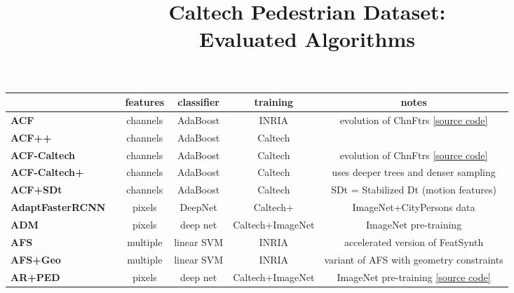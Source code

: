 \documentclass[onecolumn]{article}
\begin{document}
\title{ Caltech Pedestrian Dataset:\\ Evaluated Algorithms}
\date{}\maketitle\vspace{-8mm}

\renewcommand{\arraystretch}{1.20}
\newcommand{\chmrk}{{\centering\ding{51}}}

\def\cp{\hspace{2mm}}
\begin{table}[!h]\centering\footnotesize
\begin{tabular}{@{}l@{\cp}c|c@{\cp}c@{\cp}c|c@{}}
  & & features & classifier & training & notes \\\toprule[0.5mm]
  \textbf{ACF} & \cite{DollarPAMI14} & channels & AdaBoost & INRIA &
   evolution of ChnFtrs
   \href{http://vision.ucsd.edu/~pdollar/toolbox/doc/index.html}{[source code]}\\
  \textbf{ACF++} & \cite{OhnBarICPR16} & channels & AdaBoost & Caltech & \\
  \textbf{ACF-Caltech} & \cite{DollarPAMI14} & channels & AdaBoost & Caltech &
   evolution of ChnFtrs
   \href{http://vision.ucsd.edu/~pdollar/toolbox/doc/index.html}{[source code]}\\
  \textbf{ACF-Caltech+} & \cite{NamNIPS14} & channels & AdaBoost & Caltech &
   uses deeper trees and denser sampling\\
  \textbf{ACF+SDt} & \cite{ParkCVPR13} & channels & AdaBoost & Caltech &
   SDt = Stabilized Dt (motion features) \\
  \textbf{AdaptFasterRCNN} & \cite{ZhangCVPR17} & pixels & DeepNet & Caltech+ &
   ImageNet+CityPersons data \\
  \textbf{ADM} & \cite{ZhangTIP18} & pixels & deep net & Caltech+ImageNet &
   ImageNet pre-training \\
  \textbf{AFS} & \cite{LeviCVPR13} & multiple & linear SVM & INRIA &
   accelerated version of FeatSynth \\
  \textbf{AFS+Geo} & \cite{LeviCVPR13} & multiple & linear SVM & INRIA &
   variant of AFS with geometry constraints \\
  \textbf{AR+PED} & \cite{BrazilCVPR19} & pixels & deep net & Caltech+ImageNet &
   ImageNet pre-training \href{https://github.com/garrickbrazil/AR-Ped}{[source code]}\\

\end{tabular}
\end{table}
\end{document}
